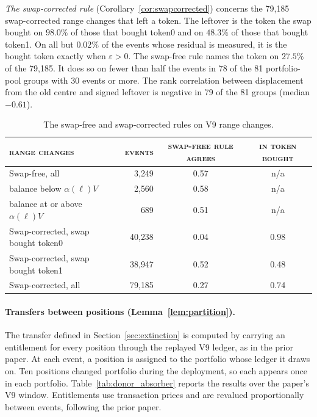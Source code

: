 \documentclass[11pt,a4paper]{article}
\DeclareRobustCommand{\thd}[1]{{\scshape\addfontfeatures{LetterSpace=1.5}\MakeLowercase{#1}}}
\theoremstyle{siphon}
\begin{document}
\emph{The swap-corrected rule} (Corollary~\ref{cor:swapcorrected}) concerns the 79{,}185 swap-corrected range changes that left a token. The leftover is the token the swap bought on $98.0\%$ of those that bought token0 and on $48.3\%$ of those that bought token1. On all but $0.02\%$ of the events whose residual is measured, it is the bought token exactly when $\varepsilon > 0$. The swap-free rule names the token on $27.5\%$ of the 79{,}185. It does so on fewer than half the events in 78 of the 81 portfolio-pool groups with 30 events or more. The rank correlation between displacement from the old centre and signed leftover is negative in 79 of the 81 groups (median $-0.61$).
\begin{table}[!htb]
\centering
\caption{The swap-free and swap-corrected rules on V9 range changes.}
\label{tab:connector}
\begin{tabular}{@{}lrcc@{}}
\toprule
\thd{Range changes} & \thd{Events} & \thd{Swap-free rule agrees} & \thd{In token bought}  \\
\midrule
Swap-free, all                         & 3{,}249  & 0.57 & n/a \\
\quad balance below $\alpha(\ell)V$    & 2{,}560  & 0.58 & n/a \\
\quad balance at or above $\alpha(\ell)V$ & 689   & 0.51 & n/a \\
Swap-corrected, swap bought token0     & 40{,}238 & 0.04 & 0.98 \\
Swap-corrected, swap bought token1     & 38{,}947 & 0.52 & 0.48 \\
Swap-corrected, all                    & 79{,}185 & 0.27 & 0.74 \\
\bottomrule
\end{tabular}
\end{table}
\paragraph{Transfers between positions (Lemma~\ref{lem:partition}).}
The transfer defined in Section~\ref{sec:extinction} is computed by carrying an entitlement for every position through the replayed V9 ledger, as in the prior paper\cite{ryan2026siphon}. At each event, a position is assigned to the portfolio whose ledger it draws on. Ten positions changed portfolio during the deployment, so each appears once in each portfolio. Table~\ref{tab:donor_absorber} reports the results over the paper's V9 window. Entitlements use transaction prices and are revalued proportionally between events, following the prior paper.
\end{document}
